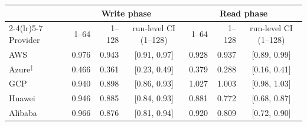 \begin{tabular}{lrrcrrc}
\toprule
 & \multicolumn{3}{c}{Write phase} & \multicolumn{3}{c}{Read phase} \\
\cmidrule(lr){2-4}\cmidrule(lr){5-7}
Provider & 1--64 & 1--128 & run-level CI (1--128) & 1--64 & 1--128 & run-level CI (1--128) \\
\midrule
AWS & 0.976 & 0.943 & [0.91, 0.97] & 0.928 & 0.937 & [0.89, 0.99] \\
Azure$^{\ddagger}$ & 0.466 & 0.361 & [0.23, 0.49] & 0.379 & 0.288 & [0.16, 0.41] \\
GCP & 0.940 & 0.898 & [0.86, 0.93] & 1.027 & 1.003 & [0.98, 1.03] \\
Huawei & 0.946 & 0.885 & [0.84, 0.93] & 0.881 & 0.772 & [0.68, 0.87] \\
Alibaba & 0.966 & 0.876 & [0.81, 0.94] & 0.920 & 0.809 & [0.72, 0.90] \\
\bottomrule
\end{tabular}
